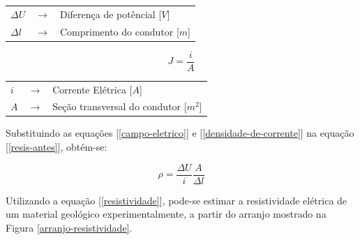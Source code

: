         {\footnotesize \noindent
            \begin{table}[H]
                \begin{tabular*}{5cm}{p{0.4cm}p{0.1cm}p{10cm}}
                    {\footnotesize $\Delta U$}  & {\footnotesize $\rightarrow$} & {\footnotesize Diferença de potêncial [$V$] }\\
                    {\footnotesize $\Delta l$}         & {\footnotesize $\rightarrow$} & {\footnotesize Comprimento do condutor [$m$]}\\
                \end{tabular*}
            \end{table}}
            
        \begin{equation}
            \label{densidade-de-corrente}
            J = \frac{i}{A}
        \end{equation}
        
        {\footnotesize \noindent
            \begin{table}[H]
                \begin{tabular*}{1cm}{p{0.05cm}p{0.1cm}p{10cm}}
                    {\footnotesize $i$}  & {\footnotesize $\rightarrow$} & {\footnotesize Corrente Elétrica [$A$] }\\
                    {\footnotesize $A$}  & {\footnotesize $\rightarrow$} & {\footnotesize Seção transversal do condutor [$m^2$]}\\
                \end{tabular*}
            \end{table}}

        \noindent Substituindo as equações [\ref{campo-eletrico}] e [\ref{densidade-de-corrente}] na equação [\ref{resis-antes}], obtém-se:
        
        \begin{equation}
            \label{resistividade}
            \rho = \dfrac{\Delta U}{i} \dfrac{A}{\Delta l}
        \end{equation}

        Utilizando a equação [\ref{resistividade}], pode-se estimar a resistividade elétrica de um material geológico experimentalmente, a partir do arranjo mostrado na Figura \ref{arranjo-resistividade}.

